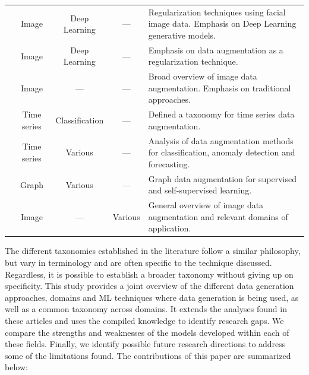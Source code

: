 \documentclass[parskip=full]{scrartcl}
\begin{document}
\begin{table}[t!]
{\begin{tabularx}{\textwidth}{@{}rcccX@{}}
        \citet{wang2020survey} & Image & Deep Learning & --- & Regularization
        techniques using facial image data. Emphasis on Deep Learning
        generative models.\\

        \citet{shorten2019survey} & Image & Deep Learning & --- & Emphasis on
        data augmentation as a regularization technique.\\

        \citet{khosla2020enhancing} & Image & --- & --- & Broad overview of
        image data augmentation. Emphasis on traditional approaches. \\

        \citet{iwana2021empirical} & Time series & Classification & --- &
        Defined a taxonomy for time series data augmentation.\\

        \citet{wen2020time} & Time series & Various & --- & Analysis of data
        augmentation methods for classification, anomaly detection and
        forecasting.\\

        \citet{zhao2022graph} & Graph & Various & --- & Graph data
        augmentation for supervised and self-supervised learning.\\

        \citet{khalifa2021comprehensive} & Image & --- & Various & General
        overview of image data augmentation and relevant domains of
        application.\\

        \bottomrule
        
    \end{tabularx}
    }
\end{table}


The different taxonomies established in the literature follow a similar
philosophy, but vary in terminology and are often specific to the technique
discussed. Regardless, it is possible to establish a broader taxonomy without
giving up on specificity. This study provides a joint overview of the
different data generation approaches, domains and ML techniques where data
generation is being used, as well as a common taxonomy across domains. It
extends the analyses found in these articles and uses the compiled knowledge
to identify research gaps. We compare the strengths and weaknesses of the
models developed within each of these fields. Finally, we identify possible
future research directions to address some of the limitations found. The
contributions of this paper are summarized below:
\end{document}

